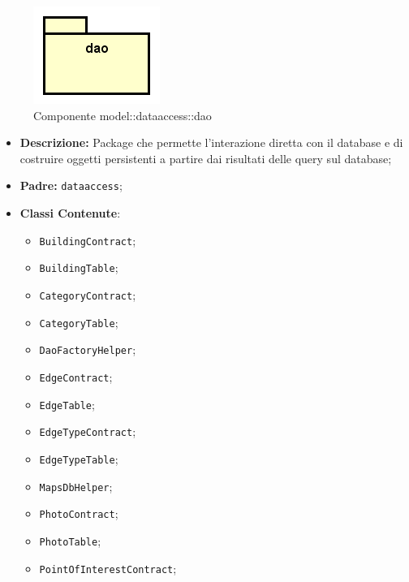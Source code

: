 \documentclass[../DefinizioneDiProdotto.tex]{subfiles}
\begin{document}
\begin{figure}[H]
	\centering
	\includegraphics[width=\maxwidth]{img/package/dao.png}
	\caption{Componente model::\-dataaccess::\-dao}\label{fig:model::dataaccess::dao} 
\end{figure}
\begin{itemize}
	\item \textbf{Descrizione:} Package che permette l'interazione diretta con il database e di costruire oggetti persistenti a partire dai risultati delle query sul database;
	\item \textbf{Padre:} \texttt{dataaccess};
	\item \textbf{Classi Contenute}:
	\begin{itemize}
		\item \texttt{BuildingContract};
		
		\item \texttt{BuildingTable};
		
		\item \texttt{CategoryContract};
		
		\item \texttt{CategoryTable};
		
		\item \texttt{DaoFactoryHelper};
		
		\item \texttt{EdgeContract};
		
		\item \texttt{EdgeTable};
		
		\item \texttt{EdgeTypeContract};
		
		\item \texttt{EdgeTypeTable};
		
		\item \texttt{MapsDbHelper};
		
		\item \texttt{PhotoContract};
		
		\item \texttt{PhotoTable};
		
		\item \texttt{PointOfInterestContract};
		

\end{itemize}
\end{itemize}
\end{document}
